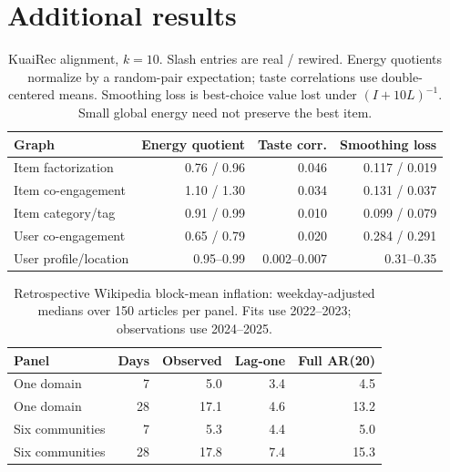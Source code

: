 \documentclass[sigconf,review,anonymous]{acmart}
\begin{document}
\section{Additional results}\label{app:extra}

\begin{table}[t]\centering\small
\setlength{\tabcolsep}{2.5pt}
\begin{tabular}{lrrr}
\toprule
Graph & Energy quotient & Taste corr. & Smoothing loss \\
\midrule
Item factorization & 0.76 / 0.96 & 0.046 & 0.117 / 0.019 \\
Item co-engagement & 1.10 / 1.30 & 0.034 & 0.131 / 0.037 \\
Item category/tag & 0.91 / 0.99 & 0.010 & 0.099 / 0.079 \\
User co-engagement & 0.65 / 0.79 & 0.020 & 0.284 / 0.291 \\
User profile/location & 0.95--0.99 & 0.002--0.007 & 0.31--0.35 \\
\bottomrule
\end{tabular}
\caption{KuaiRec alignment, $k=10$. Slash entries are real / rewired. Energy quotients normalize by a random-pair expectation; taste correlations use double-centered means. Smoothing loss is best-choice value lost under $(I+10L)^{-1}$. Small global energy need not preserve the best item.}\label{tab:align}
\end{table}

\begin{table}[t]\centering\small
\setlength{\tabcolsep}{3pt}
\begin{tabular}{lrrrr}
\toprule
Panel & Days & Observed & Lag-one & Full AR(20) \\
\midrule
One domain & 7 & 5.0 & 3.4 & 4.5 \\
One domain & 28 & 17.1 & 4.6 & 13.2 \\
Six communities & 7 & 5.3 & 4.4 & 5.0 \\
Six communities & 28 & 17.8 & 7.4 & 15.3 \\
\bottomrule
\end{tabular}
\caption{Retrospective Wikipedia block-mean inflation: weekday-adjusted medians over 150 articles per panel. Fits use 2022--2023; observations use 2024--2025.}\label{tab:inflation}
\end{table}
\end{document}

